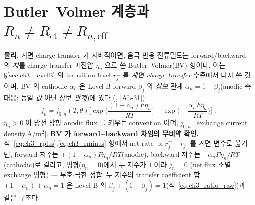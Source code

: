 \documentclass[11pt,a4paper]{article}
\newcommand{\eff}{\mathrm{eff}}
\newcommand{\ct}{\mathrm{ct}}
\newcommand{\AL}[1]{\textsf{[AL-#1]}}
\begin{document}
\section{Butler--Volmer 계층과 $R_n\ne R_\ct\ne R_{n,\eff}$}\label{sec:ch3_bv}
\textbf{물리.} 계면 charge-transfer 가 지배적이면, 음극 반응 전류밀도는 forward/backward 의 \emph{차}를
charge-transfer 과전압 $\eta_n$ 으로 쓴 Butler--Volmer(BV) 형이다. 이는 \S\ref{sec:ch3_levelB} 의 transition-level
$r_j^\pm$ 를 \emph{계면 charge-transfer} 수준에서 다시 쓴 것이며, BV 의 cathodic $\alpha_n$ 은 Level B forward
$\beta_j$ 와 \emph{상보} 관계 $\alpha_n=1-\beta_j$(anodic 측 대응; 동일 \emph{값} 아닌 상보 \emph{관계})에 있다
(\cite{bardfaulkner,newman}, \AL{31}):
\begin{equation}
\boxed{\;j_n=j_{0,n}(T,\theta)\Big[\exp\!\Big(\frac{(1-\alpha_n)F\eta_n}{RT}\Big)-\exp\!\Big(-\frac{\alpha_n F\eta_n}{RT}\Big)\Big]\;.}
\label{eq:ch3_bv}
\end{equation}
$\eta_n>0$ 이 방전 방향 anodic flux 를 키우는 convention 이며, $j_{0,n}$=exchange current density[A/m$^2$].
\textbf{BV 가 forward$-$backward 차임의 무비약 확인.} 식~\eqref{eq:ch3_rplus},\allowbreak\eqref{eq:ch3_rminus} 형에서
net rate $\propto r_j^+-r_j^-$ 를 계면 변수로 옮기면, forward 지수는 $+(1-\alpha_n)F\eta_n/RT$(anodic),
backward 지수는 $-\alpha_n F\eta_n/RT$(cathodic)로 갈리고, 평형($\eta_n=0$)에서 두 지수가 $1$ 이라 $j_n=0$
(net flux 소멸 = exchange 평형) — 부호$\cdot$극한 정합. 두 지수의 transfer coefficient 합 $(1-\alpha_n)+\alpha_n=1$
은 Level B 의 $\beta_j+(1-\beta_j)=1$(식~\eqref{eq:ch3_ratio_raw})과 같은 구조다.
\end{document}
